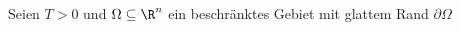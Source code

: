
\begin{exercise}

\phantom{}
	Seien $T > 0$ und $\Omega \subseteq \R^n$ ein beschränktes Gebiet mit glattem Rand $\partial \Omega$
\end{exercise}


\begin{solution}

\phantom{}

\end{solution}

